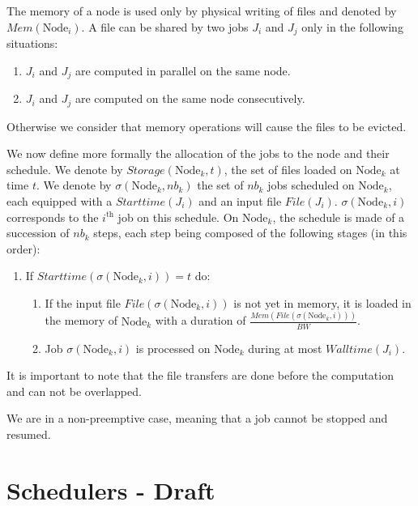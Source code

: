 \documentclass[conference,10pt]{IEEEtran}
\newcommand{\Node}[1]{\ensuremath{\mathrm{Node}_{#1}}\xspace}
\newcommand{\file}{\ensuremath{\mathit{File}}\xspace}
\newcommand{\storage}{\ensuremath{\mathit{Storage}}\xspace}
\newcommand{\memory}{\ensuremath{\mathit{Mem}}\xspace}
\newcommand{\bandwidth}{\mathit{BW}\xspace}
\newcommand{\walltime}{\mathit{Walltime}\xspace}
\newcommand{\start}{\mathit{Starttime}\xspace}
\begin{document}
The memory of a node is used only by physical writing of files and denoted by $\memory(\Node{i})$.
A file can be shared by two jobs $J_i$ and $J_j$ only in the following situations:
\begin{enumerate}
	\item $J_i$ and $J_j$ are computed in parallel on the same node.
	\item $J_i$ and $J_j$ are computed on the same node consecutively.
\end{enumerate}
Otherwise we consider that memory operations will cause the files to be evicted.

We now define more formally the allocation of the jobs to the node and
their schedule.
We denote by $\storage(\Node{k}, t)$, the set of files loaded on $\Node{k}$
at time $t$. 
We denote by $\sigma(\Node{k}, \mathit{nb}_k)$ the set of $\mathit{nb}_k$ jobs
scheduled on $\Node{k}$, each equipped with a $\start(J_i)$ and an
input file $\file(J_i)$.
$\sigma(\Node{k}, i)$ corresponds to the $i^\text{th}$ job on this schedule.
On $\Node{k}$, the schedule is made of a
succession of $\mathit{nb}_k$
steps, each step being composed of the
following stages (in this order):
\begin{enumerate}
	\item If $\start(\sigma(\Node{k}, i)) = t$ do:
	\begin{enumerate}
		\item If the input file $\file(\sigma(\Node{k}, i))$ is not yet in memory, it is 
		loaded in the memory of $\Node{k}$ with a duration of $\frac{\memory(\file(\sigma(\Node{k}, i)))}{\bandwidth}$.
		\item Job $\sigma(\Node{k}, i)$ is processed on $\Node{k}$ during at most $\walltime(J_i)$.
	\end{enumerate}
\end{enumerate}
It is important to note that the file transfers are done before the computation and can not be overlapped.

We are in a non-preemptive case, meaning that a job cannot be stopped and resumed.


\section{Schedulers - Draft}\label{sec.schedulers}
\end{document}
